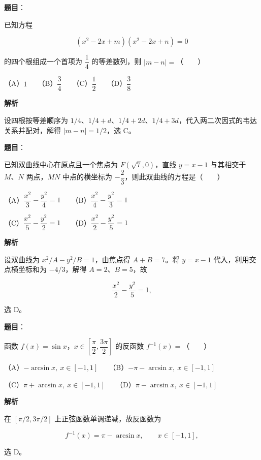 \begin{answer}

\textbf{题目}：

已知方程

\nopagebreak[4]
\[
(x^2-2x+m)(x^2-2x+n)=0
\]

的四个根组成一个首项为 $\dfrac14$ 的等差数列，则 $|m-n|=$\mbox{（　　）}

（A）$1$　　（B）$\dfrac34$　　（C）$\dfrac12$　　（D）$\dfrac38$

\textbf{解析}

设四根按等差顺序为 $1/4\text{、}1/4+d\text{、}1/4+2d\text{、}1/4+3d$，代入两二次因式的韦达关系并配对，解得 $|m-n|=1/2$，选 C。


\end{answer}
\begin{answer}

\textbf{题目}：

已知双曲线中心在原点且一个焦点为 $F(\sqrt7,0)$，直线 $y=x-1$ 与其相交于 $M\text{、}N$ 两点，$MN$ 中点的横坐标为 $-\dfrac23$，则此双曲线的方程是\mbox{（　　）}

（A）$\dfrac{x^2}{3}-\dfrac{y^2}{4}=1$　　（B）$\dfrac{x^2}{4}-\dfrac{y^2}{3}=1$

（C）$\dfrac{x^2}{5}-\dfrac{y^2}{2}=1$　　（D）$\dfrac{x^2}{2}-\dfrac{y^2}{5}=1$

\textbf{解析}

设双曲线为 $x^2/A-y^2/B=1$，由焦点得 $A+B=7$。将 $y=x-1$ 代入，利用交点横坐标和为 $-4/3$，解得 $A=2\text{、}B=5$，故

\nopagebreak[4]
\[
\frac{x^2}{2}-\frac{y^2}{5}=1,
\]

选 D。


\end{answer}
\begin{answer}

\textbf{题目}：

函数 $f(x)=\sin x$，$x\in\left[\dfrac\pi2,\dfrac{3\pi}2\right]$ 的反函数 $f^{-1}(x)=$\mbox{（　　）}

（A）$-\arcsin x,\ x\in[-1,1]$　　（B）$-\pi-\arcsin x,\ x\in[-1,1]$

（C）$\pi+\arcsin x,\ x\in[-1,1]$　　（D）$\pi-\arcsin x,\ x\in[-1,1]$

\textbf{解析}

在 $\left[\pi/2,3\pi/2\right]$ 上正弦函数单调递减，故反函数为

\nopagebreak[4]
\[
f^{-1}(x)=\pi-\arcsin x,
\qquad x\in[-1,1],
\]

选 D。


\end{answer}
